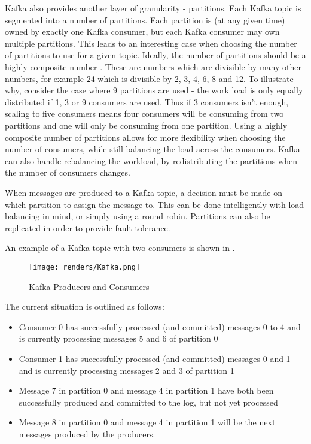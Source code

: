 Kafka also provides another layer of granularity - partitions. Each Kafka topic is segmented into a number of partitions. Each partition is (at any given time) owned by exactly one Kafka consumer, but each Kafka consumer may own multiple partitions. This leads to an interesting case when choosing the number of partitions to use for a given topic. Ideally, the number of partitions should be a highly composite number \cite {highlyCompositeNumbers}. These are numbers which are divisible by many other numbers, for example 24 which is divisible by 2, 3, 4, 6, 8 and 12. To illustrate why, consider the case where 9 partitions are used - the work load is only equally distributed if 1, 3 or 9 consumers are used. Thus if 3 consumers isn't enough, scaling to five consumers means four consumers will be consuming from two partitions and one will only be consuming from one partition. Using a highly composite number of partitions allows for more flexibility when choosing the number of consumers, while still balancing the load across the consumers. Kafka can also handle rebalancing the workload, by redistributing the partitions when the number of consumers changes. 

When messages are produced to a Kafka topic, a decision must be made on which partition to assign the message to. This can be done intelligently with load balancing in mind, or simply using a round robin. Partitions can also be replicated in order to provide fault tolerance.

An example of a Kafka topic with two consumers is shown in . 

\begin{figure}[H]
      \centering
      \texttt{[image: renders/Kafka.png]}
      \caption{Kafka Producers and Consumers}
      \label{fig:kafka}
\end{figure}  

The current situation is outlined as follows:
\begin{itemize}
\item{Consumer 0 has successfully processed (and committed) messages 0 to 4 and is currently processing messages 5 and 6 of partition 0}
\item{Consumer 1 has successfully processed (and committed) messages 0 and 1 and is currently processing messages 2 and 3 of partition 1}
\item{Message 7 in partition 0 and message 4 in partition 1 have both been successfully produced and committed to the log, but not yet processed}
\item{Message 8 in partition 0 and message 4 in partition 1 will be the next messages produced by the producers.}
\end{itemize}


